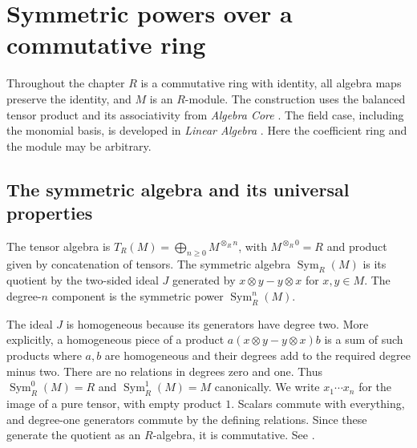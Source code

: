 \chapter{Symmetric powers over a commutative ring}\label{ch:la01-symmetric}

Throughout the chapter \(R\) is a commutative ring with identity, all
algebra maps preserve the identity, and \(M\) is an \(R\)-module.
The construction uses the balanced tensor product and its
associativity from \emph{Algebra Core}
\cite[ALG-03-C02-S01]{p103}. The field case, including the monomial
basis, is developed in \emph{Linear Algebra}
\cite[entries 15.symmetric and 15.symmetric\_basis]{d05}. Here the
coefficient ring and the module may be arbitrary.

\section{The symmetric algebra and its universal properties}

\begin{definition}
\label{def:la01-symmetric-algebra}
The tensor algebra is \(T_R(M)=\bigoplus_{n\ge 0}M^{\otimes_R n}\),
with \(M^{\otimes_R 0}=R\) and product given by concatenation of
tensors. The symmetric algebra \(\operatorname{Sym}_R(M)\) is its
quotient by the two-sided ideal \(J\) generated by
\(x\otimes y-y\otimes x\) for \(x,y\in M\). The degree-\(n\) component
is the symmetric power \(\operatorname{Sym}^n_R(M)\).
\end{definition}

The ideal \(J\) is homogeneous because its generators have degree
two. More explicitly, a homogeneous piece of a product
\(a(x\otimes y-y\otimes x)b\) is a sum of such products where \(a,b\)
are homogeneous and their degrees add to the required degree minus
two. There are no relations in degrees zero and one. Thus
\(\operatorname{Sym}^0_R(M)=R\) and
\(\operatorname{Sym}^1_R(M)=M\) canonically. We write \(x_1\cdots x_n\)
for the image of a pure tensor, with empty product \(1\). Scalars
commute with everything, and degree-one generators commute by the
defining relations. Since these generate the quotient as an
\(R\)-algebra, it is commutative. See \cite[Algebra, Section 10.13]{stacks-sym}.

